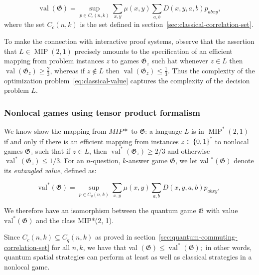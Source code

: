 \begin{defn}
\begin{equation}\label{eq:classical-value}
\operatorname{val}(\mathfrak{G})=\sup _{p \in C_{c}(n, k)} \sum_{x, y} \mu(x, y) \sum_{a, b} D(x, y, a, b) p_{a b x y},
\end{equation}
where the set $C_{c}(n, k)$ is the set defined in section~\ref{sec:classical-correlation-set}.
\end{defn}

To make the connection with interactive proof systems, observe that the assertion that $L \in \operatorname{MIP}(2,1)$ precisely amounts to the specification of an efficient mapping from problem instances $z$ to games $\mathfrak{G}_{z}$ such hat whenever $z \in L$ then $\operatorname{val}\left(\mathfrak{G}_{z}\right) \geq \frac{2}{3}$, whereas if $z \notin L$ then $\operatorname{val}\left(\mathfrak{G}_{z}\right) \leq \frac{1}{3}$. Thus the complexity of the optimization problem~\ref{eq:classical-value} captures the complexity of the decision problem $L$.

\subsubsection{Nonlocal games using tensor product formalism}\label{subsection:quantum-games}

We know show the mapping from $MIP*$ to $\mathfrak{G}$: a language $L$ is in $\operatorname{MIP}^{*}(2,1)$ if and only if there is an efficient mapping from instances $z \in\{0,1\}^{*}$ to nonlocal games $\mathfrak{G}_{z}$ such that if $z \in L$, then $\operatorname{val}^{*}\left(\mathfrak{G}_{z}\right) \geq 2 / 3$ and otherwise $\operatorname{val}^{*}\left(\mathfrak{G}_{z}\right) \leq 1 / 3$.
 For an $n$-question, $k$-answer game $\mathfrak{G}$, we let val ${ }^{*}(\mathfrak{G})$ denote its \emph{entangled value}, defined as:

\begin{defn}
    \begin{equation}
    \operatorname{val^{*}}(\mathfrak{G})=\sup _{p \in C_{q}(n, k)} \sum_{x, y} \mu(x, y) \sum_{a, b} D(x, y, a, b) p_{a b x y},
    \end{equation}
\end{defn}


We therefore have an isomorphism between the quantum game $\mathfrak{G}$ with value $\operatorname{val^{*}}(\mathfrak{G})$ and the class MIP*(2, 1).


Since $C_{c}(n, k) \subseteq C_{q}(n, k)$ as proved in section~\ref{sec:quantum-commuting-correlation-set} for all $n, k$, we have that val $(\mathfrak{G}) \leq \operatorname{val}^{*}(\mathfrak{G}) ;$ in other words, quantum spatial strategies can perform at least as well as classical strategies in a nonlocal game.


